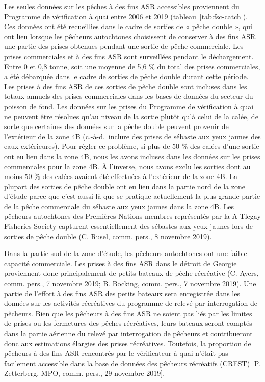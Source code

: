 \documentclass[french,11pt]{book}
\begin{document}
Les seules données sur les pêches à des fins ASR accessibles proviennent du Programme de vérification à quai entre 2006 et 2019 (tableau~\ref{tab:fsc-catch}). Ces données ont été recueillies dans le cadre de sorties de « pêche double », qui ont lieu lorsque les pêcheurs autochtones choisissent de conserver à des fins ASR une partie des prises obtenues pendant une sortie de pêche commerciale. Les prises commerciales et à des fins ASR sont surveillées pendant le déchargement. Entre 0 et 0,8 tonne, soit une moyenne de 5,6 \% du total des prises commerciales, a été débarquée dans le cadre de sorties de pêche double durant cette période. Les prises à des fins ASR de ces sorties de pêche double sont incluses dans les totaux annuels des prises commerciales dans les bases de données du secteur du poisson de fond. Les données sur les prises du Programme de vérification à quai ne peuvent être résolues qu'au niveau de la sortie plutôt qu'à celui de la calée, de sorte que certaines des données sur la pêche double peuvent provenir de l'extérieur de la zone 4B (c.-à-d.~inclure des prises de sébaste aux yeux jaunes des eaux extérieures). Pour régler ce problème, si plus de 50 \% des calées d'une sortie ont eu lieu dans la zone 4B, nous les avons incluses dans les données sur les prises commerciales pour la zone 4B. À l'inverse, nous avons exclu les sorties dont au moins 50 \% des calées avaient été effectuées à l'extérieur de la zone 4B. La plupart des sorties de pêche double ont eu lieu dans la partie nord de la zone d'étude parce que c'est aussi là que se pratique actuellement la plus grande partie de la pêche commerciale du sébaste aux yeux jaunes dans la zone 4B. Les pêcheurs autochtones des Premières Nations membres représentés par la A-Tlegay Fisheries Society capturent essentiellement des sébastes aux yeux jaunes lors de sorties de pêche double (C. Rusel, comm. pers., 8 novembre 2019).

Dans la partie sud de la zone d'étude, les pêcheurs autochtones ont une faible capacité commerciale. Les prises à des fins ASR dans le détroit de Georgie proviennent donc principalement de petits bateaux de pêche récréative (C. Ayers, comm. pers., 7 novembre 2019; B. Bocking, comm. pers., 7 novembre 2019). Une partie de l'effort à des fins ASR des petits bateaux sera enregistrée dans les données sur les activités récréatives du programme de relevé par interrogation de pêcheurs. Bien que les pêcheurs à des fins ASR ne soient pas liés par les limites de prises ou les fermetures des pêches récréatives, leurs bateaux seront comptés dans la partie aérienne du relevé par interrogation de pêcheurs et contribueront donc aux estimations élargies des prises récréatives. Toutefois, la proportion de pêcheurs à des fins ASR rencontrés par le vérificateur à quai n'était pas facilement accessible dans la base de données des pêcheurs récréatifs (CREST) {[}P. Zetterberg, MPO, comm. pers., 29 novembre 2019{]}.
\end{document}
